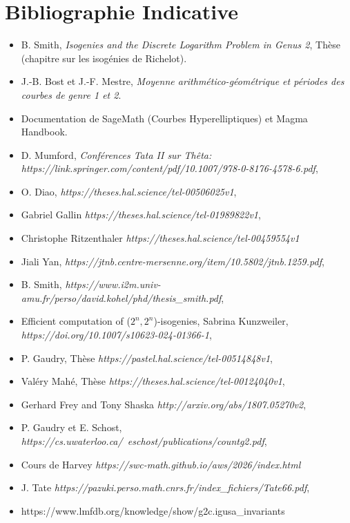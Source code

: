 \documentclass[12pt,a4paper]{article}
\begin{document}
	\section{Bibliographie Indicative}
	
	\begin{itemize}
		\item B. Smith, \textit{Isogenies and the Discrete Logarithm Problem in Genus 2},
		Thèse (chapitre sur les isogénies de Richelot).
		
		\item J.-B. Bost et J.-F. Mestre, \textit{Moyenne arithmético-géométrique et périodes
			des courbes de genre 1 et 2}.
		
		\item Documentation de SageMath (Courbes Hyperelliptiques) et Magma Handbook.
		\item D. Mumford, \textit{Conférences Tata II sur Thêta: https://link.springer.com/content/pdf/10.1007/978-0-8176-4578-6.pdf},
		\item O. Diao, \textit{https://theses.hal.science/tel-00506025v1},
		\item Gabriel Gallin \textit{https://theses.hal.science/tel-01989822v1},
		\item Christophe Ritzenthaler \textit{https://theses.hal.science/tel-00459554v1}
		\item Jiali Yan, \textit{https://jtnb.centre-mersenne.org/item/10.5802/jtnb.1259.pdf},
		\item B. Smith, \textit{https://www.i2m.univ-amu.fr/perso/david.kohel/phd/thesis\_smith.pdf},
		\item Efficient computation of ($2^n,2^n$)-isogenies, Sabrina Kunzweiler, \textit{https://doi.org/10.1007/s10623-024-01366-1},
		\item P. Gaudry, Thèse \textit{https://pastel.hal.science/tel-00514848v1},
		\item Valéry Mahé, Thèse \textit{https://theses.hal.science/tel-00124040v1},
		\item Gerhard Frey and Tony Shaska \textit{http://arxiv.org/abs/1807.05270v2},
		\item P. Gaudry et E. Schost,
		\textit{https://cs.uwaterloo.ca/~eschost/publications/countg2.pdf},
		\item Cours de Harvey \textit{https://swc-math.github.io/aws/2026/index.html}
		\item J. Tate 
		\textit{https://pazuki.perso.math.cnrs.fr/index\_fichiers/Tate66.pdf},
		\item https://www.lmfdb.org/knowledge/show/g2c.igusa\_invariants
	\end{itemize}
	
\end{document}
